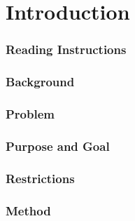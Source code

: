 \chapter{Introduction}

\setcounter{section}{2}
\setcounter{subsection}{0}



\subsection{Reading Instructions}

\subsection{Background}

\subsection{Problem}

\subsection{Purpose and Goal}

\subsection{Restrictions}

\subsection{Method}
